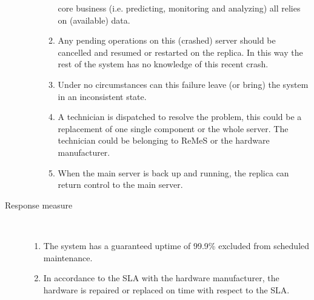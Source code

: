 \begin{description}
\begin{enumerate}
\begin{enumerate}
	   core business (i.e. predicting, monitoring and analyzing) all relies on
	   (available) data.
	   \item Any pending operations on this (crashed) server should be cancelled
	   and resumed or restarted on the replica. In this way the rest of the system
	   has no knowledge of this recent crash.
	   \item Under no circumstances can this failure leave (or bring) the system
	    in an inconsistent state.
	    \item A technician is dispatched to resolve the problem, this could be a
	    replacement of one single component or the whole server. The technician
	    could be belonging to ReMeS or the hardware manufacturer.
	    \item When the main server is back up and running, the replica can return
	    control to the main server.
	  \end{enumerate}
	\end{enumerate}
	\item[Response measure] \
	\begin{enumerate}
	  \item The system has a guaranteed uptime of 99.9\% excluded from scheduled
	  maintenance.
	  \item In accordance to the SLA with the hardware manufacturer, the hardware
	  is repaired or replaced on time with respect to the SLA.
	\end{enumerate}
\end{description}